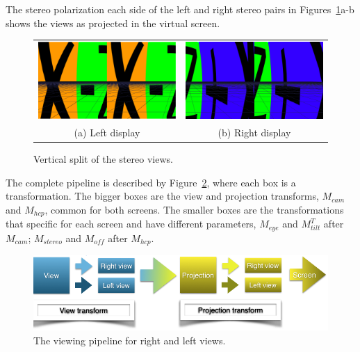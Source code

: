 The stereo polarization each side of the left and right stereo pairs in Figures~\ref{fig.split_screens}a-b shows the views as projected in the virtual screen.

\begin{figure}[!hbt]
\centering
\begin{tabular}{cc}
\includegraphics[width=0.45\linewidth,keepaspectratio=true]{figs/left_screen.png}&
\includegraphics[width=0.45\linewidth,keepaspectratio=true]{figs/right_screen.png}\\
(a) Left display & 
(b) Right display
\end{tabular}
\caption{Vertical split of the stereo views.}
\label{fig.split_screens}
\end{figure}

The complete pipeline is described by Figure~\ref{fig.osg_pipeline}, where each box is a transformation. The bigger boxes are the view and projection transforms, $M_{cam}$ and  $M_{hcp}$, common for both screens. The smaller boxes are the transformations that specific for each screen and have different parameters, $M_{eye}$ and $M_{tilt}^{T}$ after $M_{cam}$; $M_{stereo}$ and $M_{off}$ after $M_{hcp}$.

\begin{figure}[!htb]
\centering
\includegraphics[width=0.9\linewidth,keepaspectratio=true]{figs/osg_pipeline.png}
\caption{The viewing pipeline for right and left views.}
\label{fig.osg_pipeline}
\end{figure}